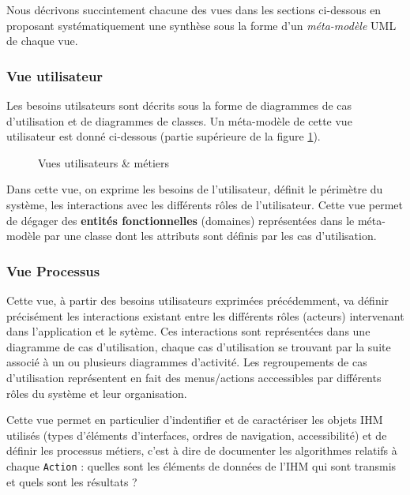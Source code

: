 Nous d\'ecrivons succintement
chacune des vues dans les sections ci-dessous en proposant
syst\'ematiquement une synth\`ese sous la forme d'un
\emph{m\'eta-mod\`ele} \textsf{UML} de chaque vue.

\subsubsection{Vue utilisateur}

Les besoins utilsateurs sont d\'ecrits sous la forme de diagrammes de cas
d'utilisation et de diagrammes de classes. Un m\'eta-mod\`ele de
cette vue utilisateur est donn\'e ci-dessous (partie sup\'erieure de la
figure \ref{fig-vue-utilisateur}).

\begin{figure}[htbp]
    \hfill{}
\centering
    \caption{Vues utilisateurs \& m\'etiers}
    \label{fig-vue-utilisateur}
\end{figure}

Dans cette vue, on exprime les besoins de l'utilisateur, d\'efinit
le p\'erim\`etre du syst\`eme, les interactions avec les
diff\'erents r\^oles de l'utilisateur. Cette vue permet de
d\'egager des \textbf{entit\'es fonctionnelles} (domaines)
repr\'esent\'ees dans le m\'eta-mod\`ele par une classe dont les
attributs sont d\'efinis par les cas d'utilisation.

\subsubsection{Vue Processus}

Cette vue, \`a partir des besoins utilisateurs exprim\'ees
pr\'ec\'edemment, va d\'efinir pr\'ecis\'ement les interactions
existant entre les diff\'erents r\^oles (acteurs) intervenant dans
l'application et  le syt\`eme. Ces interactions sont
repr\'esent\'ees dans une diagramme de cas d'utilisation, chaque cas
d'utilisation se trouvant par la suite associ\'e \`a un ou plusieurs
diagrammes d'activit\'e. Les regroupements de cas d'utilisation
repr\'esentent en fait des menus/actions acccessibles par
diff\'erents r\^oles du syst\`eme et leur organisation.

Cette vue permet en particulier d'indentifier et de caract\'eriser
les objets \textsf{IHM} utilis\'es (types d'\'el\'ements d'interfaces,
ordres de navigation, accessibilit\'e) et de d\'efinir les processus m\'etiers,
c'est \`a dire de documenter les algorithmes relatifs \`a chaque
\verb|Action| : quelles sont les \'el\'ements de donn\'ees de
l'\textsf{IHM} qui sont transmis et quels sont les r\'esultats ?

